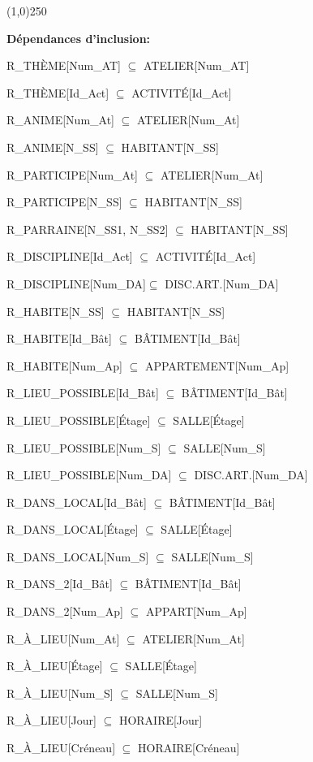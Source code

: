 \documentclass[a4paper,10.5pt]{report}
\begin{document}
	\begin{center}
	\line(1,0){250}
	\end{center}

	\textbf{Dépendances d'inclusion:}

	
	R\_THÈME[Num\_AT] $\subseteq$ ATELIER[Num\_AT]

	R\_THÈME[Id\_Act] $\subseteq$ ACTIVITÉ[Id\_Act]

	R\_ANIME[Num\_At] $\subseteq$ ATELIER[Num\_At]

	R\_ANIME[N\_SS] $\subseteq$ HABITANT[N\_SS]

	R\_PARTICIPE[Num\_At] $\subseteq$ ATELIER[Num\_At]

	R\_PARTICIPE[N\_SS] $\subseteq$ HABITANT[N\_SS]

	R\_PARRAINE[N\_SS1, N\_SS2] $\subseteq$ HABITANT[N\_SS]

	R\_DISCIPLINE[Id\_Act] $\subseteq$ ACTIVITÉ[Id\_Act]

	R\_DISCIPLINE[Num\_DA]$\subseteq$ DISC.ART.[Num\_DA]

	R\_HABITE[N\_SS] $\subseteq$ HABITANT[N\_SS]

	R\_HABITE[Id\_Bât] $\subseteq$ BÂTIMENT[Id\_Bât]

	R\_HABITE[Num\_Ap] $\subseteq$ APPARTEMENT[Num\_Ap]

	R\_LIEU\_POSSIBLE[Id\_Bât] $\subseteq$ BÂTIMENT[Id\_Bât]

	R\_LIEU\_POSSIBLE[Étage] $\subseteq$ SALLE[Étage]

	R\_LIEU\_POSSIBLE[Num\_S] $\subseteq$ SALLE[Num\_S]

	R\_LIEU\_POSSIBLE[Num\_DA] $\subseteq$ DISC.ART.[Num\_DA]

	R\_DANS\_LOCAL[Id\_Bât] $\subseteq$ BÂTIMENT[Id\_Bât]

	R\_DANS\_LOCAL[Étage] $\subseteq$ SALLE[Étage]

	R\_DANS\_LOCAL[Num\_S] $\subseteq$ SALLE[Num\_S]

	R\_DANS\_2[Id\_Bât] $\subseteq$ BÂTIMENT[Id\_Bât]

	R\_DANS\_2[Num\_Ap] $\subseteq$ APPART[Num\_Ap]

	R\_À\_LIEU[Num\_At] $\subseteq$ ATELIER[Num\_At]

	R\_À\_LIEU[Étage] $\subseteq$ SALLE[Étage]

	R\_À\_LIEU[Num\_S] $\subseteq$ SALLE[Num\_S]

	R\_À\_LIEU[Jour] $\subseteq$ HORAIRE[Jour]

	R\_À\_LIEU[Créneau] $\subseteq$ HORAIRE[Créneau]
	\\
\end{document}

